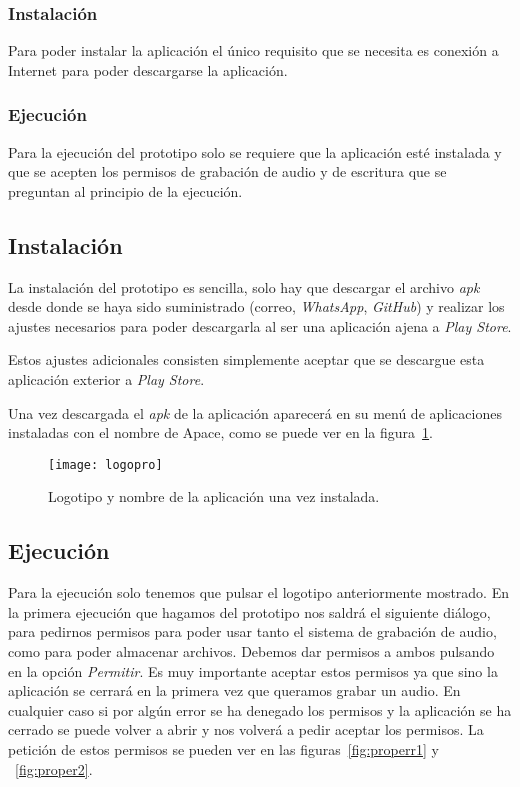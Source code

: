 \subsubsection{Instalación}
Para poder instalar la aplicación el único requisito que se necesita es conexión a Internet para poder descargarse la aplicación.

\subsubsection{Ejecución}
Para la ejecución del prototipo solo se requiere que la aplicación esté instalada y que se acepten los permisos de grabación de audio y de escritura que se preguntan al principio de la ejecución.

\subsection{Instalación}
La instalación del prototipo es sencilla, solo hay que descargar el archivo \textit{apk} desde donde se haya sido suministrado (correo, \textit{WhatsApp}, \textit{GitHub}) y realizar los ajustes necesarios para poder descargarla al ser una aplicación ajena a \textit{Play Store}.

Estos ajustes adicionales consisten simplemente aceptar que se descargue esta aplicación exterior a \textit{Play Store}.

Una vez descargada el \textit{apk} de la aplicación aparecerá en su menú de aplicaciones instaladas con el nombre de Apace, como se puede ver en la figura~\ref{fig:logopro}.

\begin{figure}[htp]
	\centering
	\texttt{[image: logopro]}
	\caption{Logotipo y nombre de la aplicación una vez instalada.}
	\label{fig:logopro}
\end{figure}

\subsection{Ejecución}
Para la ejecución solo tenemos que pulsar el logotipo anteriormente mostrado. En la primera ejecución que hagamos del prototipo nos saldrá el siguiente diálogo, para pedirnos permisos para poder usar tanto el sistema de grabación de audio, como para poder almacenar archivos. Debemos dar permisos a ambos pulsando en la opción \textit{Permitir}. Es muy importante aceptar estos permisos ya que sino la aplicación se cerrará en la primera vez que queramos grabar un audio. En cualquier caso si por algún error se ha denegado los permisos y la aplicación se ha cerrado se puede volver a abrir y nos volverá a pedir aceptar los permisos. La petición de estos permisos se pueden ver en las figuras~\ref{fig:properr1} y ~\ref{fig:proper2}.

